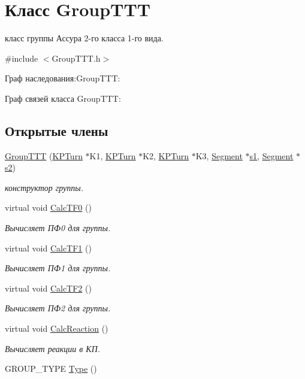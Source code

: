 \hypertarget{class_group_t_t_t}{
\section{Класс GroupTTT}
\label{class_group_t_t_t}
}


класс группы Ассура 2-\/го класса 1-\/го вида.  




{\ttfamily \#include $<$GroupTTT.h$>$}



Граф наследования:GroupTTT:


Граф связей класса GroupTTT:
\subsection*{Открытые члены}
\begin{DoxyCompactItemize}
\item 
\hyperlink{class_group_t_t_t_ab96c7bd051f45ae46ebab3fee50bcec0}{GroupTTT} (\hyperlink{class_k_p_turn}{KPTurn} $\ast$K1, \hyperlink{class_k_p_turn}{KPTurn} $\ast$K2, \hyperlink{class_k_p_turn}{KPTurn} $\ast$K3, \hyperlink{class_segment}{Segment} $\ast$\hyperlink{class_group2_a030b303d13894d1b4cc3fff13d0730e3}{s1}, \hyperlink{class_segment}{Segment} $\ast$\hyperlink{class_group2_aa48298daf05b4db8436dedf8d7b151ef}{s2})
\begin{DoxyCompactList}\small\item\em конструктор группы. \item\end{DoxyCompactList}\item 
virtual void \hyperlink{class_group_t_t_t_a92403676f7f05fc2c203aef7537402b0}{CalcTF0} ()
\begin{DoxyCompactList}\small\item\em Вычисляет ПФ0 для группы. \item\end{DoxyCompactList}\item 
virtual void \hyperlink{class_group_t_t_t_af78de1295674d17b3bb871f6d6f95c57}{CalcTF1} ()
\begin{DoxyCompactList}\small\item\em Вычисляет ПФ1 для группы. \item\end{DoxyCompactList}\item 
virtual void \hyperlink{class_group_t_t_t_afd46d51764b690eff2283be9e35c2023}{CalcTF2} ()
\begin{DoxyCompactList}\small\item\em Вычисляет ПФ2 для группы. \item\end{DoxyCompactList}\item 
virtual void \hyperlink{class_group_t_t_t_aba0fd83c6baad17518cce48d025d474b}{CalcReaction} ()
\begin{DoxyCompactList}\small\item\em Вычисляет реакции в КП. \item\end{DoxyCompactList}\item 
GROUP\_\-TYPE \hyperlink{class_group_t_t_t_add225e4ad049ec3076b386499af4821c}{Type} ()
\end{DoxyCompactItemize}
